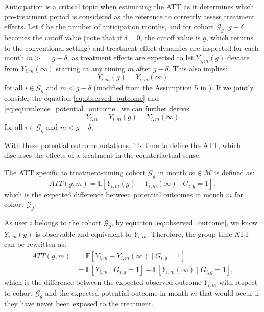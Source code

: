 Anticipation is a critical topic when estimating the ATT as it determines which pre-treatment period is considered as the reference to correctly assess treatment effects. Let $\delta$ be the number of anticipation months, and for cohort $\mathcal{G}_g$, $g-\delta$ becomes the cutoff value (note that if $\delta=0$, the cutoff value is $g$, which returns to the conventional setting) and treatment effect dynamics are inspected for each month $m >= g-\delta$, as treatment effects are expected to let $Y_{i, m}(g)$ deviate from $Y_{i, m}(\infty)$ starting at any timing $m$ after $g-\delta$. This also implies:
\begin{equation}\label{eq:equivalence_potential_outcome}
    Y_{i, m}(g) = Y_{i, m}(\infty)
\end{equation}
for all $i \in \mathcal{G}_g$ and $m < g - \delta$ (modified from the Assumption 5 in \cite{roth2023s}). If we jointly consider the equation \ref{eq:observed_outcome} and \ref{eq:equivalence_potential_outcome}, we can further derive:
\begin{equation}\label{eq:equivalence_observed_outcome_pretreatment}
    Y_{i, m} = Y_{i, m}(g) = Y_{i, m}(\infty)
\end{equation}
for all $i \in \mathcal{G}_g$ and $m < g - \delta$.

With these potential outcome notations, it's time to define the ATT, which discusses the effects of a treatment in the counterfactual sense.

\begin{definition}\label{def:ATTgt}
The ATT specific to treatment-timing cohort $\mathcal{G}_g$ in month $m \in \mathcal{M}$ is defined as:
$$
ATT(g, m)
= \mathbb{E}[Y_{i, m}(g) - Y_{i, m}(\infty) \mid G_{i, g} = 1],
$$
which is the expected difference between potential outcomes in month $m$ for cohort $\mathcal{G}_g$.
\end{definition}

As user $i$ belongs to the cohort $\mathcal{G}_g$, by equation \ref{eq:observed_outcome}, we know $Y_{i, m}(g)$ is observable and equivalent to $Y_{i, m}$. Therefore, the group-time ATT can be rewritten as:
\begin{align}\label{def:ATTgt_v2}
ATT(g, m)
&=
\mathbb{E}[
    Y_{i, m} - Y_{i, m}(\infty)
    \mid G_{i, g} = 1
]
\nonumber \\
&=
\mathbb{E}[
    Y_{i, m}
    \mid G_{i, g} = 1
]
-
\mathbb{E}[
    Y_{i, m}(\infty)
    \mid G_{i, g} = 1
],
\end{align}
which is the difference between the expected observed outcome $Y_{i, m}$ with respect to cohort $\mathcal{G}_g$ and the expected potential outcome in month $m$ that would occur if they have never been exposed to the treatment.

